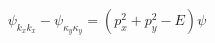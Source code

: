 \begin{equation} 
\psi_{k_x k_x} -\psi_{\kappa_y \kappa_y}  =
	\left( p^2_x + p^2_y - E \right) \psi
\label{eq:hyperbolic1}
\end{equation}

